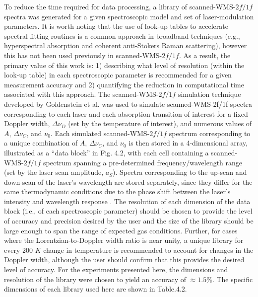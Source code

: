 To reduce the time required for data processing, a library of scanned-WMS-$2f/1f$ spectra was generated for a given spectroscopic model and set of laser-modulation parameters. It is worth noting that the use of look-up tables to accelerate spectral-fitting routines is a common approach in broadband techniques (e.g., hyperspectral absorption and coherent anti-Stokers Raman scattering), however this has not been used previously in scanned-WMS-$2f/1f$. As a result, the primary value of this work is: 1) describing what level of resolution (within the look-up table) in each spectroscopic parameter is recommended for a given measurement accuracy and 2) quantifying the reduction in computational time associated with this approach. The scanned-WMS-$2f/1f$ simulation technique developed by Goldenstein et al. \cite{Goldenstein2014} was used to simulate scanned-WMS-2f/1f spectra corresponding to each laser and each absorption transition of interest for a fixed Doppler width, $\Delta\nu_D$ (set by the temperature of interest), and numerous values of $A$, $\Delta\nu_C$, and $\nu_0$. Each simulated scanned-WMS-$2f/1f$ spectrum corresponding to a unique combination of $A$, $\Delta\nu_C$, and $\nu_0$ is then stored in a 4-dimensional array, illustrated as a “data block” in Fig. 4.2, with each cell containing a scanned-WMS-$2f/1f$ spectrum spanning a pre-determined frequency/wavelength range (set by the laser scan amplitude, $a_S$). Spectra corresponding to the up-scan and down-scan of the laser’s wavelength are stored separately, since they differ for the same thermodynamic conditions due to the phase shift between the laser’s intensity and wavelength response \cite{Goldenstein2014}.
The resolution of each dimension of the data block (i.e., of each spectroscopic parameter) should be chosen to provide the level of accuracy and precision desired by the user and the size of the library should be large enough to span the range of expected gas conditions. Further, for cases where the Lorentzian-to-Doppler width ratio is near unity, a unique library for every 200 $K$ change in temperature is recommended to account for changes in the Doppler width, although the user should confirm that this provides the desired level of accuracy. For the experiments presented here, the dimensions and resolution of the library were chosen to yield an accuracy of $\approx 1.5\%$. The specific dimensions of each library used here are shown in Table.4.2.

